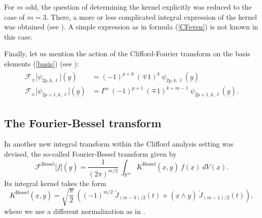 \documentclass{amsart}
\theoremstyle{remark}
\begin{document}
For $m$ odd, the question of determining the kernel explicitly was reduced to the case of $m=3$. There, a more or less complicated integral expression of the kernel was obtained (see \cite[Lemma 4.5]{DBXu}). A simple expression as in formula (\ref{CFeven}) is not known in this case.

Finally, let us mention the action of the Clifford-Fourier transform on the basis elements (\ref{basis}) (see \cite{MR2190678}):
\begin{align} \label{eigenvalue C-F}
\begin{split}
{\mathcal{F}}_{\pm}\lbrack \psi_{2p,k,\ell}\rbrack({\underline{y}}) &= (-1)^{p+k} \ (\mp 1)^k \ \psi_{2p,k,\ell}({\underline{y}})\\
{\mathcal{F}}_{\pm}\lbrack \psi_{2p+1,k,\ell}\rbrack({\underline{y}}) &= I^m \ (-1)^{p+1} \ (\mp1)^{k+m-1} \ \psi_{2p+1,k,\ell}({\underline{y}}).
\end{split}
\end{align}
\subsection{The Fourier-Bessel transform}
In \cite{FourierBessel} another new integral transform within the Clifford analysis setting was devised, the so-called Fourier-Bessel transform given by
\begin{displaymath}
{\mathcal{F}}^{\mathrm{Bessel}} \lbrack f \rbrack ({\underline{y}}) = \frac{1}{(2 \pi)^{m/2}} \ \int_{\mathbb{R}^m} K^{\mathrm{Bessel}}({\underline{x}},{\underline{y}}) \ f({\underline{x}}) \ dV({\underline{x}}).
\end{displaymath}
Its integral kernel takes the form
\begin{equation}\label{kernel F-B}
K^{\mathrm{Bessel}}({\underline{x}},{\underline{y}}) = \sqrt{\frac{\pi}{2}} \ \left( (-1)^{m/2} \ \widetilde{J}_{(m-3)/2}(t) + ({\underline{x}} \wedge {\underline{y}}) \ \widetilde{J}_{(m-1)/2}(t) \right),
\end{equation}
where we use a different normalization as in \cite{FourierBessel}. 
\end{document}
